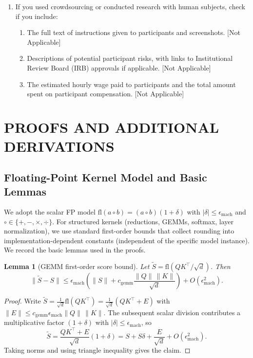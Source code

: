 \documentclass[twoside]{article}
\newtheorem{lemma}{Lemma}
\theoremstyle{definition}
\theoremstyle{remark}
\begin{document}
\begin{enumerate}
  \item If you used crowdsourcing or conducted research with human subjects, check if you include:
  \begin{enumerate}
    \item The full text of instructions given to participants and screenshots. [Not Applicable]
    \item Descriptions of potential participant risks, with links to Institutional Review Board (IRB) approvals if applicable. [Not Applicable]
    \item The estimated hourly wage paid to participants and the total amount spent on participant compensation. [Not Applicable]
  \end{enumerate}

\end{enumerate}

\newpage

\clearpage
\appendix
\onecolumn

\section{PROOFS AND ADDITIONAL DERIVATIONS}
\label{app:proofs}

\subsection{Floating-Point Kernel Model and Basic Lemmas}
\label{app:kernels-lemmas}

We adopt the scalar FP model $\mathrm{fl}(a\circ b)=(a\circ b)(1+\delta)$ with $|\delta|\le\epsilon_{\mathrm{mach}}$ and $\circ\in\{+,-,\times,\div\}$. For structured kernels (reductions, GEMMs, softmax, layer normalization), we use standard first-order bounds that collect rounding into implementation-dependent constants (independent of the specific model instance). We record the basic lemmas used in the proofs.

\begin{lemma}[GEMM first-order score bound]
\label{lem:score-bound}
Let $\widetilde{S}=\mathrm{fl}(QK^\top/\sqrt d)$. Then
\[
\|\widetilde{S}-S\|
\le
\epsilon_{\mathrm{mach}}
\left(
\|S\|
+
c_{\mathrm{gemm}}\frac{\|Q\|\,\|K\|}{\sqrt d}
\right)
+
O(\epsilon_{\mathrm{mach}}^2).
\]
\end{lemma}

\begin{proof}
Write $\widetilde{S}=\tfrac{1}{\sqrt d}\mathrm{fl}(QK^\top)=\tfrac{1}{\sqrt d}(QK^\top+E)$ with $\|E\|\le c_{\mathrm{gemm}}\epsilon_{\mathrm{mach}}\|Q\|\,\|K\|$. The subsequent scalar division contributes a multiplicative factor $(1+\delta)$ with $|\delta|\le\epsilon_{\mathrm{mach}}$, so
\[
\widetilde{S}
=
\frac{QK^\top+E}{\sqrt d}(1+\delta)
=
S + S\delta + \frac{E}{\sqrt d} + O(\epsilon_{\mathrm{mach}}^2).
\]
Taking norms and using triangle inequality gives the claim.
\end{proof}
\end{document}
